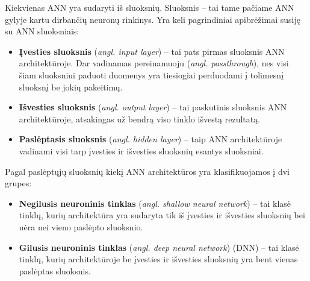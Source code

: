 \documentclass{VUMIFPSbakalaurinis}
\begin{document}
\label{subsubsubsec:neural_layers}
{
	Kiekvienas ANN yra sudaryti iš sluoksnių. Sluoksnis -- tai tame pačiame ANN gylyje kartu dirbančių neuronų rinkinys. Yra keli pagrindiniai apibrėžimai susiję su ANN sluoksniais: 
	
	\begin{itemize}
		\item \textbf{Įvesties sluoksnis} (\textit{angl. input layer}) -- tai pats pirmas sluoksnis ANN architektūroje. Dar vadinamas pereinamuoju (\textit{angl. passthrough}), nes visi šiam sluoksniui paduoti duomenys yra tiesiogiai perduodami į tolimesnį sluoksnį be jokių pakeitimų.
		
		\item \textbf{Išvesties sluoksnis} (\textit{angl. output layer}) -- tai paskutinis sluoksnis ANN architektūroje, atsakingas už bendrą viso tinklo išvestą rezultatą.
		
		\item \textbf{Paslėptasis sluoksnis} (\textit{angl. hidden layer}) -- taip ANN architektūroje vadinami visi tarp įvesties ir išvesties sluoksnių esantys sluoksniai.
	\end{itemize}
	
	Pagal paslėptųjų sluoksnių kiekį ANN architektūros yra klasifikuojamos į dvi grupes:
	
	\begin{itemize}
		\item \textbf{Negilusis neuroninis tinklas} (\textit{angl. shallow neural network}) -- tai klasė tinklų, kurių architektūra yra sudaryta tik iš įvesties ir išvesties sluoksnių bei nėra nei vieno paslėpto sluoksnio.
		
		\item \textbf{Gilusis neuroninis tinklas} (\textit{angl. deep neural network}) (DNN) -- tai klasė tinklų, kurių architektūroje be įvesties ir išvesties sluoksnių yra bent vienas paslėptas sluoksnis.
\end{itemize}
}
\end{document}
